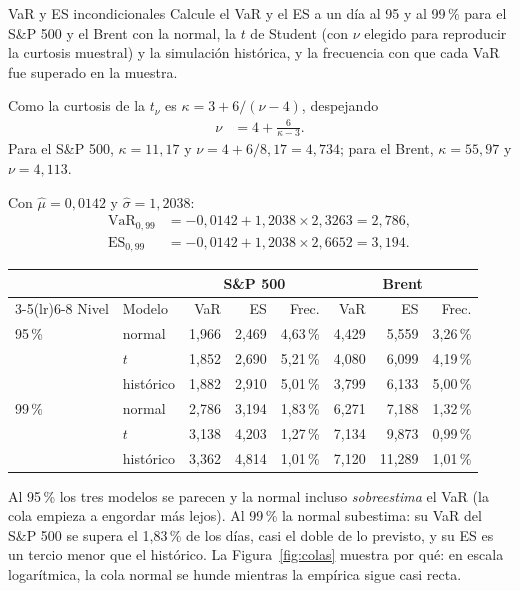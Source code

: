\begin{ejresuelto}{VaR y ES incondicionales}\label{ej:varincond}
\enunciado Calcule el VaR y el ES a un día al 95 y al 99\,\% para el S\&P 500 y el Brent con la normal, la $t$ de Student
(con $\nu$ elegido para reproducir la curtosis muestral) y la simulación histórica, y la frecuencia con que cada VaR
fue superado en la muestra.

\solucion
{} Como la curtosis de la $t_\nu$ es $\kappa=3+6/(\nu-4)$, despejando
\begin{align*}
  \nu &= 4+\frac{6}{\kappa-3}.
\end{align*}
Para el S\&P 500, $\kappa=11{,}17$ y $\nu=4+6/8{,}17=4{,}734$; para el Brent, $\kappa=55{,}97$ y $\nu=4{,}113$.

 Con $\hat\mu=0{,}0142$ y $\hat\sigma=1{,}2038$:
\begin{align*}
  \mathrm{VaR}_{0{,}99} &= -0{,}0142+1{,}2038\times2{,}3263=2{,}786,\\
  \mathrm{ES}_{0{,}99}  &= -0{,}0142+1{,}2038\times2{,}6652=3{,}194 .
\end{align*}

\begin{center}\small
\begin{tabular}{@{}llrrrrrr@{}}
\toprule
 & & \multicolumn{3}{c}{S\&P 500} & \multicolumn{3}{c}{Brent} \\
\cmidrule(lr){3-5}\cmidrule(lr){6-8}
Nivel & Modelo & VaR & ES & Frec. & VaR & ES & Frec. \\
\midrule
95\,\% & normal    & 1,966 & 2,469 & 4,63\,\% & 4,429 & 5,559 & 3,26\,\% \\
       & $t$       & 1,852 & 2,690 & 5,21\,\% & 4,080 & 6,099 & 4,19\,\% \\
       & histórico & 1,882 & 2,910 & 5,01\,\% & 3,799 & 6,133 & 5,00\,\% \\
99\,\% & normal    & 2,786 & 3,194 & 1,83\,\% & 6,271 & 7,188 & 1,32\,\% \\
       & $t$       & 3,138 & 4,203 & 1,27\,\% & 7,134 & 9,873 & 0,99\,\% \\
       & histórico & 3,362 & 4,814 & 1,01\,\% & 7,120 & 11,289 & 1,01\,\% \\
\bottomrule
\end{tabular}
\end{center}
Al 95\,\% los tres modelos se parecen y la normal incluso \emph{sobreestima} el VaR (la cola empieza a engordar más
lejos). Al 99\,\% la normal subestima: su VaR del S\&P 500 se supera el 1,83\,\% de los días, casi el doble de lo
previsto, y su ES es un tercio menor que el histórico. La Figura~\ref{fig:colas} muestra por qué: en escala
logarítmica, la cola normal se hunde mientras la empírica sigue casi recta.


\end{ejresuelto}
